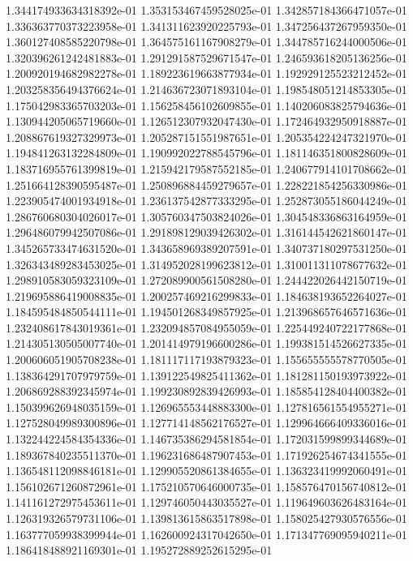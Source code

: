 1.344174933634318392e-01
1.353153467459528025e-01
1.342857184366471057e-01
1.336363770373223958e-01
1.341311623920225793e-01
1.347256437267959350e-01
1.360127408585220798e-01
1.364575161167908279e-01
1.344785716244000506e-01
1.320396261242481883e-01
1.291291587529671547e-01
1.246593618205136256e-01
1.200920194682982278e-01
1.189223619663877934e-01
1.192929125523212452e-01
1.203258356494376624e-01
1.214636723071893104e-01
1.198548051214853305e-01
1.175042983365703203e-01
1.156258456102609855e-01
1.140206083825794636e-01
1.130944205065719660e-01
1.126512307932047430e-01
1.172464932950918887e-01
1.208867619327329973e-01
1.205287151551987651e-01
1.205354224247321970e-01
1.194841263132284809e-01
1.190992022788545796e-01
1.181146351800828609e-01
1.183716955761399819e-01
1.215942179587552185e-01
1.240677914101708662e-01
1.251664128390595487e-01
1.250896884459279657e-01
1.228221854256330986e-01
1.223905474001934918e-01
1.236137542877333295e-01
1.252873055186044249e-01
1.286760680304026017e-01
1.305760347503824026e-01
1.304548336863164959e-01
1.296486079942507086e-01
1.291898129039426302e-01
1.316144542621860147e-01
1.345265733474631520e-01
1.343658969389207591e-01
1.340737180297531250e-01
1.326343489283453025e-01
1.314952028199623812e-01
1.310011311078677632e-01
1.298910583059323109e-01
1.272089900561508280e-01
1.244422026442150719e-01
1.219695886419008835e-01
1.200257469216299833e-01
1.184638193652264027e-01
1.184595484850544111e-01
1.194501268349857925e-01
1.213968657646571636e-01
1.232408617843019361e-01
1.232094857084955059e-01
1.225449240722177868e-01
1.214305130505007740e-01
1.201414979196600286e-01
1.199381514526627335e-01
1.200606051905708238e-01
1.181117117193879323e-01
1.155655555578770505e-01
1.138364291707979759e-01
1.139122549825411362e-01
1.181281150193973922e-01
1.206869288392345974e-01
1.199230892839426993e-01
1.185854128404400382e-01
1.150399626948035159e-01
1.126965553448883300e-01
1.127816561554955271e-01
1.127528049989300896e-01
1.127714148562176527e-01
1.129964666409336016e-01
1.132244224584354336e-01
1.146735386294581854e-01
1.172031599899344689e-01
1.189367840235511370e-01
1.196231686487907453e-01
1.171926254674341555e-01
1.136548112098846181e-01
1.129905520861384655e-01
1.136323419992060491e-01
1.156102671260872961e-01
1.175210570646000735e-01
1.158576470156740812e-01
1.141161272975453611e-01
1.129746050443035527e-01
1.119649603626483164e-01
1.126319326579731106e-01
1.139813615863517898e-01
1.158025427930576556e-01
1.163777059938399944e-01
1.162600924317042650e-01
1.171347769095940211e-01
1.186418488921169301e-01
1.195272889252615295e-01
